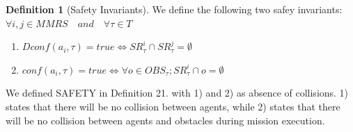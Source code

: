 \documentclass[journal]{IEEEtran}
\theoremstyle{definition}
\newtheorem{definition}{Definition}
\begin{document}







\begin{definition}[Safety Invariants]
We define the following two safey invariants: $ \forall i,j \in MMRS  \quad and \quad \forall \tau \in T$ 
\begin{enumerate}
\item $ Dconf(a_i, \tau)=true \iff SR_\tau^i \cap SR_\tau^j  = \emptyset        $  
\item $  conf(a_i, \tau)=true  \iff  \forall o \in OBS_\tau;
SR_\tau^i \cap o = \emptyset $ \\
\end{enumerate}
\end{definition}







We defined SAFETY in Definition 21. with 1) and 2) as  absence of collisions. 
1) states that there will be no collision between agents, 
while 2) states that there will be no collision between agents and obstacles during mission execution. 



\end{document}
